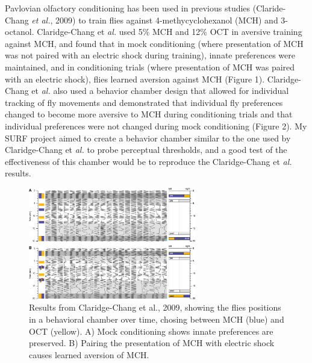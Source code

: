 \documentclass{article}
\begin{document}
Pavlovian olfactory conditioning has been used in previous studies (Claride-Chang \textit{et al.}, 2009) to train flies against 4-methycyclohexanol (MCH) and 3-octanol. Claridge-Chang et \textit{al.} used 5\% MCH and 12\% OCT in aversive training against MCH, and found that in mock conditioning (where presentation of MCH was not paired with an electric shock during training), innate preferences were maintained, and in conditioning trials (where presentation of MCH was paired with an electric shock), flies learned aversion against MCH (Figure 1). Claridge-Chang et \textit{al.} also used a behavior chamber design that allowed for individual tracking of fly movements and demonstrated that individual fly preferences changed to become more aversive to MCH during conditioning trials and that individual preferences were not changed during mock conditioning (Figure 2). My SURF project aimed to create a behavior chamber similar to the one used by Claridge-Chang et \textit{al.} to probe perceptual thresholds, and a good test of the effectiveness of this chamber would be to reproduce the Claridge-Chang et \textit{al.} results. \\

\begin{figure}[h]
\begin{center}
\includegraphics[width=0.65\textwidth]{Figures/CC1}
\caption{Results from Claridge-Chang et al., 2009, showing the flies positions in a behavioral chamber over time, chosing between MCH (blue) and OCT (yellow). A) Mock conditioning shows innate preferences are preserved. B) Pairing the presentation of MCH with electric shock causes learned aversion of MCH.}
\end{center}
\end{figure}
\end{document}
